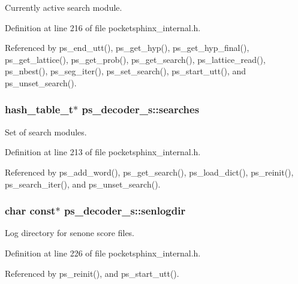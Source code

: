 Currently active search module. 



Definition at line 216 of file pocketsphinx\-\_\-internal.\-h.



Referenced by ps\-\_\-end\-\_\-utt(), ps\-\_\-get\-\_\-hyp(), ps\-\_\-get\-\_\-hyp\-\_\-final(), ps\-\_\-get\-\_\-lattice(), ps\-\_\-get\-\_\-prob(), ps\-\_\-get\-\_\-search(), ps\-\_\-lattice\-\_\-read(), ps\-\_\-nbest(), ps\-\_\-seg\-\_\-iter(), ps\-\_\-set\-\_\-search(), ps\-\_\-start\-\_\-utt(), and ps\-\_\-unset\-\_\-search().

\subsubsection[{searches}]{\setlength{\rightskip}{0pt plus 5cm}hash\-\_\-table\-\_\-t$\ast$ ps\-\_\-decoder\-\_\-s\-::searches}\label{structps__decoder__s_a43bca42790684eefb8d01a0aef6fa530}


Set of search modules. 



Definition at line 213 of file pocketsphinx\-\_\-internal.\-h.



Referenced by ps\-\_\-add\-\_\-word(), ps\-\_\-get\-\_\-search(), ps\-\_\-load\-\_\-dict(), ps\-\_\-reinit(), ps\-\_\-search\-\_\-iter(), and ps\-\_\-unset\-\_\-search().

\subsubsection[{senlogdir}]{\setlength{\rightskip}{0pt plus 5cm}char const$\ast$ ps\-\_\-decoder\-\_\-s\-::senlogdir}\label{structps__decoder__s_a0ed3476113fe3d63b13ac5e8da3f3b4f}


Log directory for senone score files. 



Definition at line 226 of file pocketsphinx\-\_\-internal.\-h.



Referenced by ps\-\_\-reinit(), and ps\-\_\-start\-\_\-utt().

